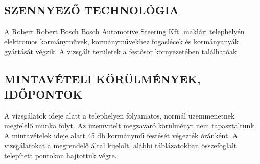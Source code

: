 \documentclass[a4paper,12pt]{article}
\begin{document}
	\subsection{SZENNYEZŐ TECHNOLÓGIA}
		\begin{adjustwidth}{1cm}{0cm}
			A Robert Robert Bosch Bosch Automotive Steering Kft. maklári telephelyén elektromos kormányművek,
			kormányművekhez fogaslécek és kormányanyák gyártását végzik. A vizsgált területek a
			festősor környezetében találhatóak.
		\end{adjustwidth}
	
	\subsection{MINTAVÉTELI KÖRÜLMÉNYEK, IDŐPONTOK}
	\begin{adjustwidth}{1cm}{0cm}
		A vizsgálatok ideje alatt a telephelyen folyamatos, normál üzemmenetnek megfelelő
		munka folyt. Az üzemvitelt megzavaró körülményt nem tapasztaltunk. A mintavételek
		ideje alatt 45 db kormánymű festését végezték óránként. A vizsgálatokat a megrendelő
		által kijelölt, alábbi táblázatokban összefoglalt telepített pontokon hajtottuk végre.
		
	\end{adjustwidth}
	\newpage  %
\end{document}
